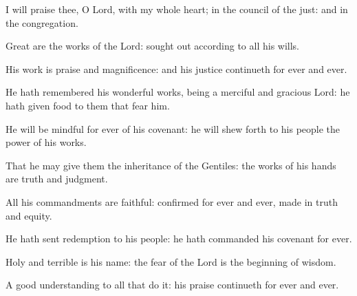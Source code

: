 \item I will praise thee, O Lord, with my whole heart; in the council of the just: and in the congregation.
\item Great are the works of the Lord: sought out according to all his wills.
\item His work is praise and magnificence: and his justice continueth for ever and ever.
\item He hath remembered his wonderful works, being a merciful and gracious Lord: he hath given food to them that fear him.
\item He will be mindful for ever of his covenant: he will shew forth to his people the power of his works.
\item That he may give them the inheritance of the Gentiles: the works of his hands are truth and judgment.
\item All his commandments are faithful: confirmed for ever and ever, made in truth and equity.
\item He hath sent redemption to his people: he hath commanded his covenant for ever.
\item Holy and terrible is his name: the fear of the Lord is the beginning of wisdom.
\item A good understanding to all that do it: his praise continueth for ever and ever.